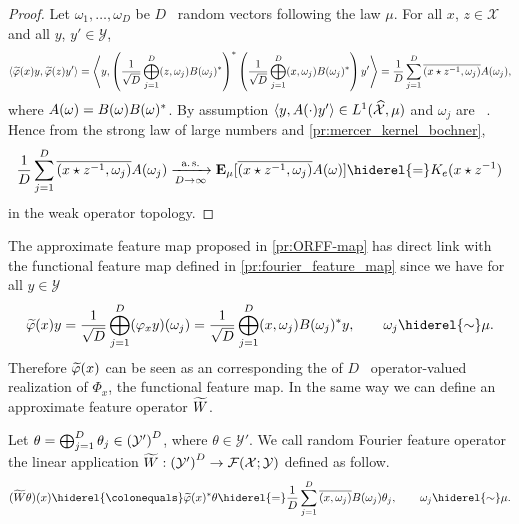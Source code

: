 \begin{proof}
Let $\omega_1, \ldots, \omega_D$ be $D$ \iid~random vectors following the law $\mu$. For all $x$, $z \in \mathcal{X}$ and all $y$, $y' \in \mathcal{Y}$,
\begin{dmath*}
\inner*{\tildePhi{1:D}(x)y,\tildePhi{1:D}(z)y'}=\inner*{y,\left(\frac{1}{\sqrt{D}}\Vect_{j=1}^D\pairing{z, \omega_j}B(\omega_j)^\adjoint \right)^\adjoint  \left(\frac{1}{\sqrt{D}}\Vect_{j=1}^D\pairing{x, \omega_j}B(\omega_j)^\adjoint \right)y'}
= \frac{1}{D} \sum_{j=1}^D \conj{\pairing{x\groupop \inv{z}, \omega_j}}A(\omega_j),
\end{dmath*}
where $A(\omega)=B(\omega)B(\omega)^\adjoint $. By assumption $\inner{y, A(\cdot)y'}\in L^1(\dual{\mathcal{X}},\mu)$ and $\omega_j$ are \iid~. Hence from the strong law of large numbers and \cref{pr:mercer_kernel_bochner},
\begin{dmath*}
\frac{1}{D} \sum_{j=1}^D \conj{\pairing{x\groupop\inv{z},\omega_j}}A(\omega_j)\converges{\asurely}{D\to\infty}\expectation_{\mu}[\conj{\pairing{x\groupop z^{-1},\omega_j}}A(\omega)]\hiderel{=}K_e(x\groupop\inv{z})
\end{dmath*}
in the weak operator topology.
\end{proof}
The approximate feature map proposed in \cref{pr:ORFF-map} has direct link with the functional feature map defined in \cref{pr:fourier_feature_map} since we have for all $y\in\mathcal{Y}$
\begin{dmath}
\tildePhi{1:D}(x)y = \frac{1}{\sqrt{D}} \Vect_{j=1}^D (\Phi_x y)(\omega_j) = \frac{1}{\sqrt{D}}\Vect_{j=1}^D\pairing{x, \omega_j}B(\omega_j)^\adjoint y, \qquad \omega_j \hiderel{\sim} \mu.
\end{dmath}
Therefore $\tildePhi{1:D}(x)$ can be seen as an  corresponding the  of $D$ \iid~operator-valued realization of $\Phi_x$, the functional feature map. In the same way we can define an approximate feature operator $\tildeW{D}$.
\begin{definition}
Let $\theta=\vect_{j=1}^D\theta_j\in\left(\mathcal{Y}'\right)^D$, where $\theta\in\mathcal{Y}'$. We call random Fourier feature operator the linear application $\tildeW{D}:\left(\mathcal{Y}'\right)^D\to\mathcal{F}(\mathcal{X};\mathcal{Y})$ defined as follow.
\begin{dmath}
(\tildeW{D} \theta)(x) \hiderel{\colonequals} \tildePhi{1:D}(x)^\adjoint \theta\hiderel{=}\frac{1}{D}\sum_{j=1}^D \conj{\pairing{x,\omega_j}}B(\omega_j)\theta_j, \qquad \omega_j \hiderel{\sim} \mu.
\end{dmath}
\end{definition}
